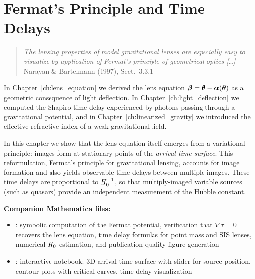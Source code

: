 
\chapter{Fermat's Principle and Time Delays}
\label{ch:fermat_time_delays}

\begin{quote}
\textit{The lensing properties of model gravitational lenses are especially easy to
visualize by application of Fermat's principle of geometrical optics [\ldots]}
\hfill --- Narayan \& Bartelmann (1997), Sect.~3.3.1
\end{quote}

\noindent
In Chapter~\ref{ch:lens_equation} we derived the lens equation
$\boldsymbol{\beta} = \boldsymbol{\theta} - \boldsymbol{\alpha}(\boldsymbol{\theta})$ as a geometric
consequence of light deflection.  In Chapter~\ref{ch:light_deflection}
we computed the Shapiro time delay experienced by photons passing
through a gravitational potential, and in
Chapter~\ref{ch:linearized_gravity} we introduced the effective
refractive index of a weak gravitational field.

In this chapter we show that the lens equation itself emerges from a
variational principle: images form at stationary points of the
\emph{arrival-time surface}.  This reformulation, Fermat's principle for
gravitational lensing, accounts for image formation and also yields
observable time delays between multiple images.  These time
delays are proportional to $H_0^{-1}$, so that
multiply-imaged variable sources (such as quasars) provide an
independent measurement of the Hubble constant.

\medskip
\noindent
\textbf{Companion Mathematica files:}
\begin{itemize}[nosep]
    \item {}:
          symbolic computation of the Fermat potential, verification
          that $\nabla\tau = 0$ recovers the lens equation, time delay
          formulas for point mass and SIS lenses, numerical $H_0$
          estimation, and publication-quality figure generation
    \item {}:
          interactive notebook: 3D arrival-time surface with slider
          for source position, contour plots with critical curves,
          time delay visualization
\end{itemize}


